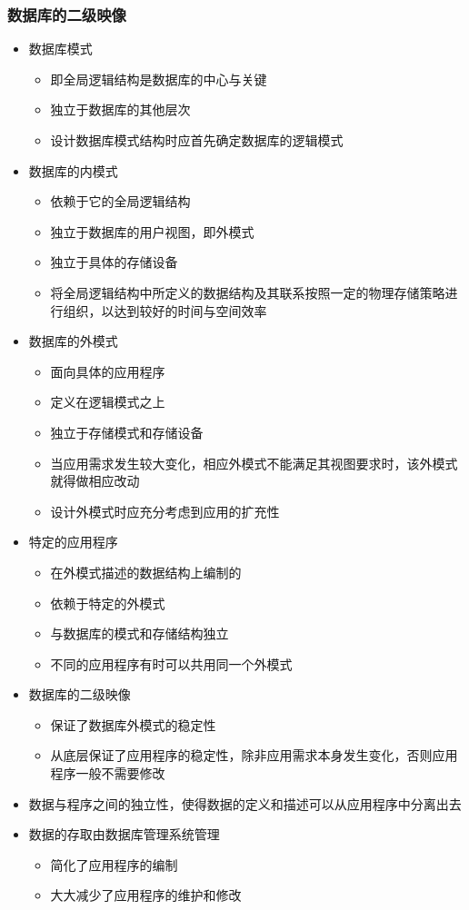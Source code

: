 \subsubsection{数据库的二级映像}
\begin{itemize}
    \item 数据库模式
    \begin{itemize}
        \item 即全局逻辑结构是数据库的中心与关键
        \item 独立于数据库的其他层次 
        \item 设计数据库模式结构时应首先确定数据库的逻辑模式
    \end{itemize}
    \item 数据库的内模式
    \begin{itemize}
        \item 依赖于它的全局逻辑结构
        \item 独立于数据库的用户视图，即外模式
        \item 独立于具体的存储设备 
        \item 将全局逻辑结构中所定义的数据结构及其联系按照一定的物理存储策略进行组织，以达到较好的时间与空间效率
    \end{itemize}
    \item 数据库的外模式
    \begin{itemize}
        \item 面向具体的应用程序
        \item 定义在逻辑模式之上
        \item 独立于存储模式和存储设备
        \item 当应用需求发生较大变化，相应外模式不能满足其视图要求时，该外模式就得做相应改动
        \item 设计外模式时应充分考虑到应用的扩充性
    \end{itemize}
    \item 特定的应用程序
    \begin{itemize}
        \item 在外模式描述的数据结构上编制的
        \item 依赖于特定的外模式
        \item 与数据库的模式和存储结构独立
        \item 不同的应用程序有时可以共用同一个外模式
    \end{itemize}
    \item 数据库的二级映像
    \begin{itemize}
        \item 保证了数据库外模式的稳定性
        \item 从底层保证了应用程序的稳定性，除非应用需求本身发生变化，否则应用程序一般不需要修改
    \end{itemize}
    \item 数据与程序之间的独立性，使得数据的定义和描述可以从应用程序中分离出去
    \item 数据的存取由数据库管理系统管理
    \begin{itemize}
        \item 简化了应用程序的编制
        \item 大大减少了应用程序的维护和修改
    \end{itemize}
\end{itemize}

